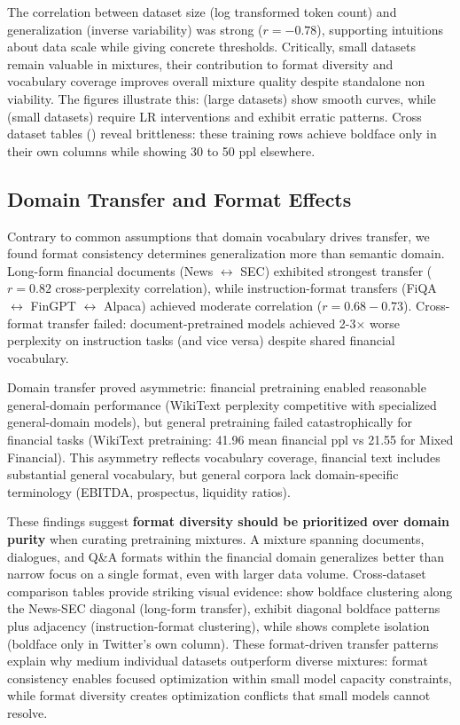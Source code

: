 The correlation between dataset size (log transformed token count) and generalization (inverse variability) was strong ($r = -0.78$), supporting intuitions about data scale while giving concrete thresholds. Critically, small datasets remain valuable in mixtures, their contribution to format diversity and vocabulary coverage improves overall mixture quality despite standalone non viability. The figures illustrate this:  (large datasets) show smooth curves, while  (small datasets) require LR interventions and exhibit erratic patterns. Cross dataset tables () reveal brittleness: these training rows achieve boldface only in their own columns while showing 30 to 50 ppl elsewhere.

\subsection{Domain Transfer and Format Effects}

Contrary to common assumptions that domain vocabulary drives transfer, we found format consistency determines generalization more than semantic domain. Long-form financial documents (News $\leftrightarrow$ SEC) exhibited strongest transfer ($r = 0.82$ cross-perplexity correlation), while instruction-format transfers (FiQA $\leftrightarrow$ FinGPT $\leftrightarrow$ Alpaca) achieved moderate correlation ($r = 0.68-0.73$). Cross-format transfer failed: document-pretrained models achieved 2-3$\times$ worse perplexity on instruction tasks (and vice versa) despite shared financial vocabulary.

Domain transfer proved asymmetric: financial pretraining enabled reasonable general-domain performance (WikiText perplexity competitive with specialized general-domain models), but general pretraining failed catastrophically for financial tasks (WikiText pretraining: 41.96 mean financial ppl vs 21.55 for Mixed Financial). This asymmetry reflects vocabulary coverage, financial text includes substantial general vocabulary, but general corpora lack domain-specific terminology (EBITDA, prospectus, liquidity ratios).

These findings suggest \textbf{format diversity should be prioritized over domain purity} when curating pretraining mixtures. A mixture spanning documents, dialogues, and Q\&A formats within the financial domain generalizes better than narrow focus on a single format, even with larger data volume. Cross-dataset comparison tables provide striking visual evidence:  show boldface clustering along the News-SEC diagonal (long-form transfer),  exhibit diagonal boldface patterns plus adjacency (instruction-format clustering), while  shows complete isolation (boldface only in Twitter's own column). These format-driven transfer patterns explain why medium individual datasets outperform diverse mixtures: format consistency enables focused optimization within small model capacity constraints, while format diversity creates optimization conflicts that small models cannot resolve.

